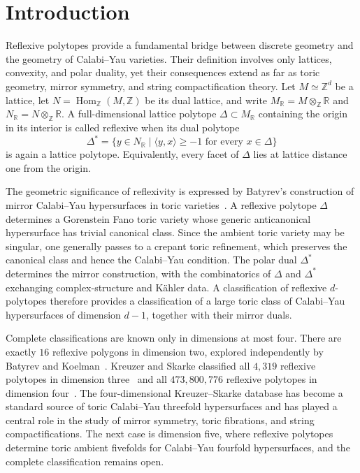 \documentclass[appliedmath,article,submit,moreauthors]{Definitions/mdpi}
\newcommand{\Z}{\mathbb{Z}}
\newcommand{\R}{\mathbb{R}}
\begin{document}
\section{Introduction}
\label{sec:intro}

Reflexive polytopes provide a fundamental bridge between discrete geometry and
the geometry of Calabi--Yau varieties. Their definition involves only lattices,
convexity, and polar duality, yet their consequences extend as far as toric
geometry, mirror symmetry, and string compactification theory. Let
\(M\simeq\Z^d\) be a lattice, let \(N=\operatorname{Hom}_{\Z}(M,\Z)\) be its
dual lattice, and write \(M_{\R}=M\otimes_{\Z}\R\) and
\(N_{\R}=N\otimes_{\Z}\R\). A full-dimensional lattice polytope \(\Delta\subset
M_{\R}\) containing the origin in its interior is called reflexive when its dual
polytope
\[
\Delta^*
=
\{y\in N_{\R}\mid \langle y,x\rangle\geq -1
\text{ for every }x\in\Delta\}
\]
is again a lattice polytope. Equivalently, every facet of \(\Delta\) lies at
lattice distance one from the origin.

The geometric significance of reflexivity is expressed by Batyrev's construction
of mirror Calabi--Yau hypersurfaces in toric varieties~\cite{Batyrev1994}. A
reflexive polytope \(\Delta\) determines a Gorenstein Fano toric variety whose
generic anticanonical hypersurface has trivial canonical class. Since the
ambient toric variety may be singular, one generally passes to a crepant toric
refinement, which preserves the canonical class and hence the Calabi--Yau
condition. The polar dual \(\Delta^*\) determines the mirror construction, with
the combinatorics of \(\Delta\) and \(\Delta^*\) exchanging complex-structure
and K\"ahler data. A classification of reflexive \(d\)-polytopes therefore
provides a classification of a large toric class of Calabi--Yau hypersurfaces of
dimension \(d-1\), together with their mirror duals.

Complete classifications are known only in dimensions at most four. There are
exactly \(16\) reflexive polygons in dimension two, explored independently by
Batyrev and Koelman~\cite{Batyrev1985,Koelman1991}. Kreuzer and Skarke
classified all \(4{,}319\) reflexive polytopes in dimension
three~\cite{KreuzerSkarke1998} and all \(473{,}800{,}776\) reflexive polytopes
in dimension four~\cite{KreuzerSkarke2000}. The four-dimensional Kreuzer--Skarke
database has become a standard source of toric Calabi--Yau threefold
hypersurfaces and has played a central role in the study of mirror symmetry,
toric fibrations, and string compactifications. The next case is dimension five,
where reflexive polytopes determine toric ambient fivefolds for Calabi--Yau
fourfold hypersurfaces, and the complete classification remains open.
\end{document}
